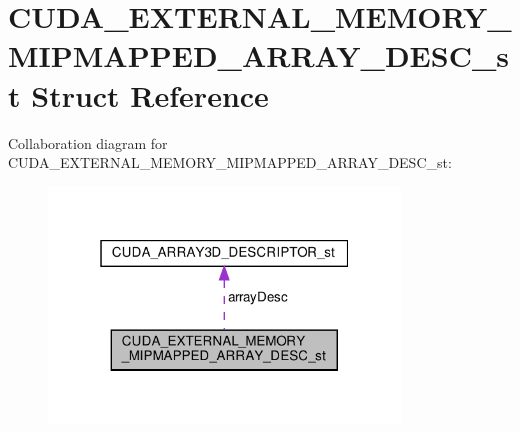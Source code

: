 \hypertarget{structCUDA__EXTERNAL__MEMORY__MIPMAPPED__ARRAY__DESC__st}{}\section{C\+U\+D\+A\+\_\+\+E\+X\+T\+E\+R\+N\+A\+L\+\_\+\+M\+E\+M\+O\+R\+Y\+\_\+\+M\+I\+P\+M\+A\+P\+P\+E\+D\+\_\+\+A\+R\+R\+A\+Y\+\_\+\+D\+E\+S\+C\+\_\+st Struct Reference}
\label{structCUDA__EXTERNAL__MEMORY__MIPMAPPED__ARRAY__DESC__st}


Collaboration diagram for C\+U\+D\+A\+\_\+\+E\+X\+T\+E\+R\+N\+A\+L\+\_\+\+M\+E\+M\+O\+R\+Y\+\_\+\+M\+I\+P\+M\+A\+P\+P\+E\+D\+\_\+\+A\+R\+R\+A\+Y\+\_\+\+D\+E\+S\+C\+\_\+st\+:\nopagebreak
\begin{figure}[H]
\begin{center}
\leavevmode
\includegraphics[width=265pt]{structCUDA__EXTERNAL__MEMORY__MIPMAPPED__ARRAY__DESC__st__coll__graph}
\end{center}
\end{figure}
